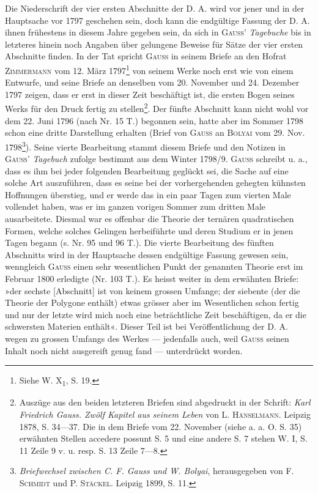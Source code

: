 \noindent\hspace*{\parindent}Die Niederschrift der vier ersten Abschnitte der D. A. wird vor jener und in der Hauptsache vor 1797 geschehen sein, doch kann die endgültige Fassung der D. A. ihnen frühestens in diesem Jahre gegeben sein, da sich in \textsc{Gauss}’ \textit{Tagebuche} bis in letzteres hinein noch Angaben über gelungene Beweise für Sätze der vier ersten Abschnitte finden. In der Tat spricht \textsc{Gauss} in seinem Briefe an den Hofrat \textsc{Zimmermann} vom 12. März 1797\footnote{Siehe W. X\textsubscript{1}, S. 19.} von seinem Werke noch erst wie von einem Entwurfe, und seine Briefe an denselben vom 20. November und 24. Dezember 1797 zeigen, dass er erst in dieser Zeit beschäftigt ist, die ersten Bogen seines Werks für den Druck fertig zu stellen\begingroup\renewcommand{\thefootnote}{**)}\footnote{Auszüge aus den beiden letzteren Briefen sind abgedruckt in der Schrift: \textit{Karl Friedrich Gauss. Zwölf Kapitel aus seinem Leben} von L. \textsc{Hänselmann}. Leipzig 1878, S. 34—37. Die in dem Briefe vom 22. November (siehe a. a. O. S. 35) erwähnten Stellen accedere possunt S. 5 und eine andere S. 7 stehen W. I, S. 11 Zeile 9 v. u. resp. S. 13 Zeile 7—8.}\endgroup. Der fünfte Abschnitt kann nicht wohl vor dem 22. Juni 1796 (nach Nr. 15 T.) begonnen sein, hatte aber im Sommer 1798 schon eine dritte Darstellung erhalten (Brief von \textsc{Gauss} an \textsc{Bolyai} vom 29. Nov. 1798\begingroup\renewcommand{\thefootnote}{***)}\footnote{\textit{Briefwechsel zwischen C. F. Gauss und W. Bolyai}, herausgegeben von F. \textsc{Schmidt} und P. \textsc{Stäckel}. Leipzig 1899, S. 11.}\endgroup). Seine vierte Bearbeitung stammt diesem Briefe und den Notizen in \textsc{Gauss}’ \textit{Tagebuch} zufolge bestimmt aus dem Winter 1798/9. \textsc{Gauss} schreibt u. a., dass es ihm bei jeder folgenden Bearbeitung geglückt sei, die Sache auf eine solche Art auszuführen, dass es seine bei der vorhergehenden gehegten kühnsten Hoffnungen überstieg, und er werde das in ein paar Tagen zum vierten Male vollendet haben, was er im ganzen vorigen Sommer zum dritten Male ausarbeitete. Diesmal war es offenbar die Theorie der ternären quadratischen Formen, welche solches Gelingen herbeiführte und deren Studium er in jenen Tagen begann (s. Nr. 95 und 96 T.). Die vierte Bearbeitung des fünften Abschnitts wird in der Hauptsache dessen endgültige Fassung gewesen sein, wenngleich \textsc{Gauss} einen sehr wesentlichen Punkt der genannten Theorie erst im Februar 1800 erledigte (Nr. 103 T.). Es heisst weiter in dem erwähnten Briefe: »der sechste [Abschnitt] ist von keinem grossen Umfange; der siebente (der die Theorie der Polygone enthält) etwas grösser aber im Wesentlichen schon fertig und nur der letzte wird mich noch eine beträchtliche Zeit beschäftigen, da er die schwersten Materien enthält«. Dieser Teil ist bei Veröffentlichung der D. A.\newpage
{}
\noindent wegen zu grossen Umfangs des Werkes — jedenfalls auch, weil \textsc{Gauss} seinen Inhalt noch nicht ausgereift genug fand — unterdrückt worden.

